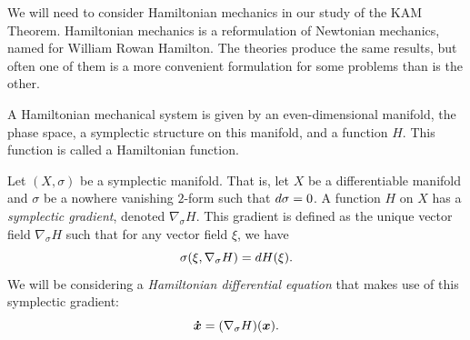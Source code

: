 \documentclass[twoside,letterpaper,11pt]{article}
\newcommand{\sgrad}{\nabla_{\sigma}}
\numberwithin{equation}{section}
\begin{document}
We will need to consider Hamiltonian mechanics in our study of the KAM Theorem.
Hamiltonian mechanics is a reformulation of Newtonian mechanics, named for
William Rowan Hamilton.
The theories produce the same results, but often one of them is a more
convenient formulation for some problems than is the other.

A Hamiltonian mechanical system is given by an even-dimensional manifold, the
phase space, a symplectic structure on this manifold, and a function $H$.
This function is called a Hamiltonian function.

Let $(X, \sigma)$ be a symplectic manifold.
That is, let $X$ be a differentiable manifold and $\sigma$ be a nowhere
vanishing $2$-form such that $\mathop{}\!d \sigma = 0$.
A function $H$ on $X$ has a \emph{symplectic gradient}, denoted $\sgrad H$.
This gradient is defined as the unique vector field $\sgrad H$ such that for any
vector field $\xi$, we have
\begin{equation}
  \label{eq:symplectic-grad}
  \sigma(\xi, \sgrad H) = \dif H(\xi).
\end{equation}
We will be considering a \emph{Hamiltonian differential equation} that makes use
of this symplectic gradient:
\begin{equation}
  \label{eq:hamiltonian-diff-eq}
  \bd{x} = (\sgrad H) (\bp{x}).
\end{equation}
\end{document}
